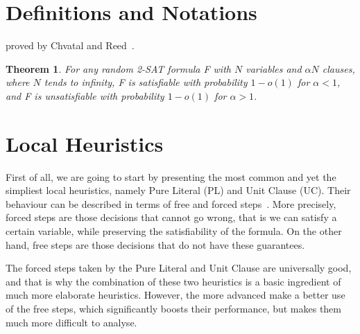 \documentclass[10pt]{article}
\newtheorem{theorem}{Theorem}[section]
\begin{document}
\section{Definitions and Notations}

proved by Chvatal and Reed~\cite{2satratio}.
\begin{theorem}\label{lem:chvatal}
    For any random 2-SAT formula F with $N$ variables and $\alpha N$ clauses, where $N$ tends to infinity, F is satisfiable with probability $1 - o(1)$ for $\alpha < 1$, and F is unsatisfiable with probability $1 - o(1)$ for $\alpha > 1$.
\end{theorem}
\section{Local Heuristics}
\par
First of all, we are going to start by presenting the most common and yet the simpliest local heuristics, namely Pure Literal (PL) and Unit Clause (UC). Their behaviour can be described in terms of free and forced steps~\cite{satdiffeq}. More precisely, forced steps are those decisions that cannot go wrong, that is we can satisfy a certain variable, while preserving the satisfiability of the formula. On the other hand, free steps are those decisions that do not have these guarantees.

\par
The forced steps taken by the Pure Literal and Unit Clause are universally good, and that is why the combination of these two heuristics is a basic ingredient of much more elaborate heuristics. However, the more advanced make a better use of the free steps, which significantly boosts their performance, but makes them much more difficult to analyse.
\end{document}
